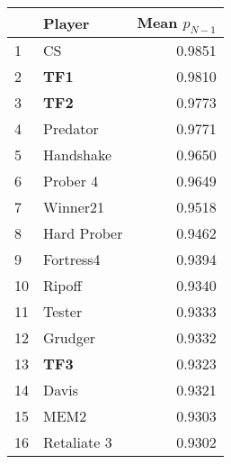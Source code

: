 \begin{tabular}{llr}
\toprule
{} &       Player &  Mean $p_{N-1}$ \\
\midrule
1  &           CS &          0.9851 \\
2  &          \textbf{TF1} &          0.9810 \\
3  &          \textbf{TF2} &          0.9773 \\
4  &     Predator &          0.9771 \\
5  &    Handshake &          0.9650 \\
6  &     Prober 4 &          0.9649 \\
7  &     Winner21 &          0.9518 \\
8  &  Hard Prober &          0.9462 \\
9  &    Fortress4 &          0.9394 \\
10 &       Ripoff &          0.9340 \\
11 &       Tester &          0.9333 \\
12 &      Grudger &          0.9332 \\
13 &          \textbf{TF3} &          0.9323 \\
14 &        Davis &          0.9321 \\
15 &         MEM2 &          0.9303 \\
16 &  Retaliate 3 &          0.9302 \\
\bottomrule
\end{tabular}
